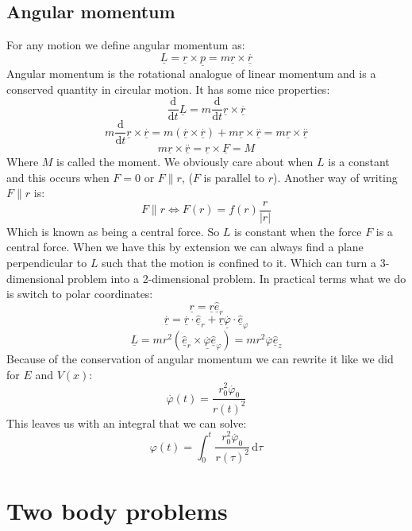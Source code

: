 \documentclass[12pt]{article}
\newcommand{\uvec}[1]{\underline{\hat{#1}}}
\newcommand{\bvec}[1]{\uvec{e}_#1}
\newcommand{\df}[2]{\frac{\text{d}#1}{\text{d}#2}}
\begin{document}
\subsection*{Angular momentum}
For any motion we define angular momentum as:
\[\underline{L}=\underline{r}\times\underline{p}=m\underline{r}\times \overset{.}{\underline{r}}\]
Angular momentum is the rotational analogue of linear momentum and is a conserved quantity in circular motion. It has some nice properties:
\[\df{}{t}\underline{L}=m\df{}{t}\underline{r}\times \overset{.}{\underline{r}}\]
\[m\df{}{t}\underline{r}\times \overset{.}{\underline{r}}=m(\overset{.}{\underline{r}}\times\overset{.}{\underline{r}})+m\underline{r}\times \overset{..}{\underline{r}}=m\underline{r}\times \overset{..}{\underline{r}}\]
\[m\underline{r}\times \overset{..}{\underline{r}}=\underline{r}\times\underline{F}=M\]
Where \(M\) is called the moment. We obviously care about when \(L\) is a constant and this occurs when \(F=0\) or \(F\parallel r\), (\(F\) is parallel to \(r\)). Another way of writing \(F\parallel r\) is:
\[F\parallel r\iff F(r)=f(r)\frac{r}{\vert r \vert}\]
Which is known as being a central force. So \(L\) is constant when the force \(F\) is a central force. When we have this by extension we can always find a plane perpendicular to \(L\) such that the motion is confined to it. Which can turn a 3-dimensional problem into a 2-dimensional problem. In practical terms what we do is switch to polar coordinates:
\[\underline{r}=\underline{r}\bvec{r}\]
\[\overset{.}{\underline{r}}=\overset{.}{\underline{r}}\cdot\bvec{r}+\underline{r}\overset{.}{\underline{\varphi}}\cdot\bvec{\varphi}\]
\[\underline{L}=mr^2\left(\bvec{r}\times\overset{.}{\underline{\varphi}}\bvec{\varphi}\right)=mr^2\overset{.}{\varphi}\bvec{z}\]
Because of the conservation of angular momentum we can rewrite it like we did for \(E\) and \(V(x)\):
\[\overset{.}{\varphi}(t)=\frac{r_0^2\overset{.}{\varphi}_0}{r(t)^2}\]
This leaves us with an integral that we can solve:
\[\varphi(t)=\int^t_0\frac{r_0^2\overset{.}{\varphi}_0}{r(\tau)^2}\,\text{d}\tau\]
\section{Two body problems}
\end{document}
